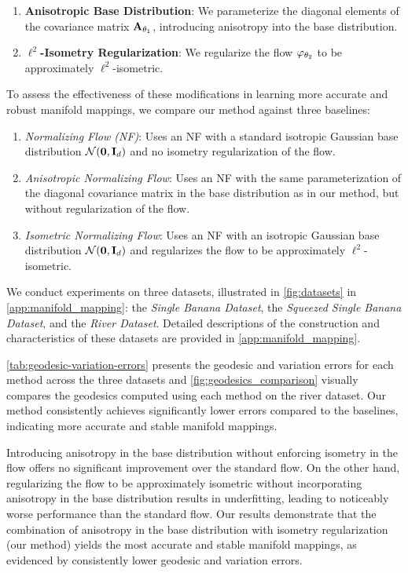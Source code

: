 \begin{enumerate}
    \item \textbf{Anisotropic Base Distribution}: We parameterize the diagonal elements of the covariance matrix \(\mathbf{A}_{\theta_1}\), introducing anisotropy into the base distribution.
    
    \item \textbf{\(\ell^2\)-Isometry Regularization}: We regularize the flow \(\varphi_{\theta_2}\) to be approximately \(\ell^2\)-isometric.
\end{enumerate}

To assess the effectiveness of these modifications in learning more accurate and robust manifold mappings, we compare our method against three baselines:

\begin{enumerate}[label=(\arabic*)]
    \item \emph{Normalizing Flow (NF)}: Uses an NF with a standard isotropic Gaussian base distribution $\mathcal{N}(\mathbf{0}, \mathbf{I}_d)$ and no isometry regularization of the flow.
    \item \emph{Anisotropic Normalizing Flow}: Uses an NF with the same parameterization of the diagonal covariance matrix in the base distribution as in our method, but without regularization of the flow.
    \item \emph{Isometric Normalizing Flow}: Uses an NF with an isotropic Gaussian base distribution $\mathcal{N}(\mathbf{0}, \mathbf{I}_d)$ and regularizes the flow to be approximately $\ell^2$-isometric.
\end{enumerate}

We conduct experiments on three datasets, illustrated in \ref{fig:datasets} in \ref{app:manifold_mapping}: the \emph{Single Banana Dataset}, the \emph{Squeezed Single Banana Dataset}, and the \emph{River Dataset}. Detailed descriptions of the construction and characteristics of these datasets are provided in \ref{app:manifold_mapping}.

\ref{tab:geodesic-variation-errors} presents the geodesic and variation errors for each method across the three datasets and \ref{fig:geodesics_comparison} visually compares the geodesics computed using each method on the river dataset. Our method consistently achieves significantly lower errors compared to the baselines, indicating more accurate and stable manifold mappings. 

Introducing anisotropy in the base distribution without enforcing isometry in the flow offers no significant improvement over the standard flow. On the other hand, regularizing the flow to be approximately isometric without incorporating anisotropy in the base distribution results in underfitting, leading to noticeably worse performance than the standard flow. Our results demonstrate that the combination of anisotropy in the base distribution with isometry regularization (our method) yields the most accurate and stable manifold mappings, as evidenced by consistently lower geodesic and variation errors.

